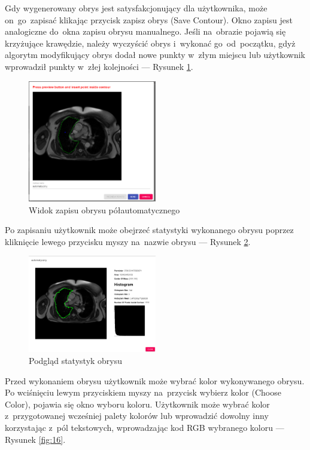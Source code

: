\documentclass[a4paper,11pt,twoside,openright]{report}
\theoremstyle{definition}
\begin{document}
\pagebreak

Gdy wygenerowany obrys jest satysfakcjonujący dla użytkownika, może on~go~zapisać
klikając przycisk zapisz obrys (Save Contour). Okno zapisu jest analogiczne do~okna zapisu
obrysu manualnego. Jeśli na~obrazie pojawią się krzyżujące krawędzie, należy
wyczyścić obrys i~wykonać go~od~początku, gdyż algorytm modyfikujący obrys dodał
nowe punkty w~złym miejscu lub użytkownik wprowadził punkty w~złej kolejności
--- Rysunek \ref{fig:14}.

\begin{figure}[h!]
	\center
	\includegraphics[width=0.5\textwidth]{14}
	\caption{Widok zapisu obrysu półautomatycznego}
    	\label{fig:14}
\end{figure}

Po zapisaniu użytkownik może obejrzeć statystyki wykonanego obrysu poprzez
kliknięcie lewego przycisku myszy na~nazwie obrysu --- Rysunek \ref{fig:15}.

\begin{figure}[h!]
	\center
	\includegraphics[width=0.5\textwidth]{15}
	\caption{Podgląd statystyk obrysu}
    	\label{fig:15}
\end{figure}

\pagebreak

Przed wykonaniem obrysu użytkownik może wybrać kolor wykonywanego obrysu.
Po wciśnięciu lewym przyciskiem myszy na~przycisk wybierz kolor (Choose Color),
pojawia się okno wyboru koloru. Użytkownik może wybrać kolor z~przygotowanej
wcześniej palety kolorów lub wprowadzić dowolny inny korzystając z~pól tekstowych,
wprowadzając kod RGB wybranego koloru --- Rysunek \ref{fig:16}.
\end{document}
